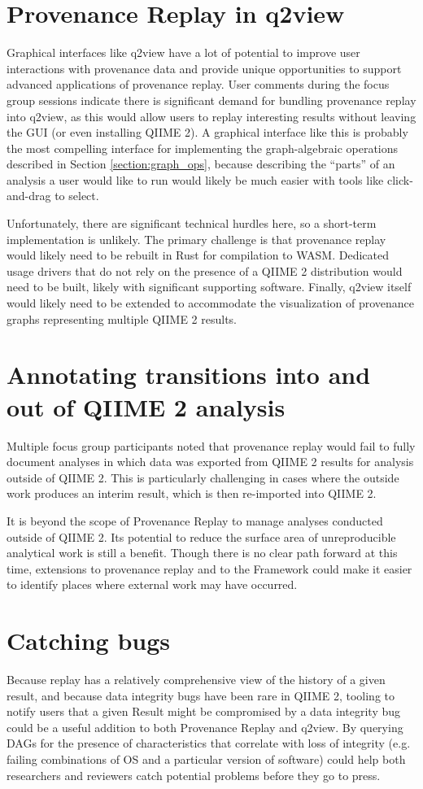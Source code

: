 \section{Provenance Replay in q2view \parencite[Issue 123]{qiime_2_development_team_issues_2016}}
Graphical interfaces like q2view have a lot of potential to improve user
interactions with provenance data and provide unique opportunities to support
advanced applications of provenance replay. User comments during the focus group
sessions indicate there is significant demand for bundling provenance replay
into q2view, as this would allow users to replay interesting results without
leaving the GUI (or even installing QIIME 2). A graphical interface like this is
probably the most compelling interface for implementing the graph-algebraic
operations described in Section \ref{section:graph_ops}, because describing
the “parts” of an analysis a user would like to run would likely be much easier
with tools like click-and-drag to select.

Unfortunately, there are significant technical hurdles here, so a short-term
implementation is unlikely. The primary challenge is that provenance replay
would likely need to be rebuilt in Rust for compilation to WASM. Dedicated usage
drivers that do not rely on the presence of a QIIME 2 distribution would need to
be built, likely with significant supporting software. Finally, q2view itself
would likely need to be extended to accommodate the visualization of provenance
graphs representing multiple QIIME 2 results.

\section{Annotating transitions into and out of QIIME 2 analysis \parencite[Issue 80]{keefe_issues_2021}}
Multiple focus group participants noted that provenance replay would fail to
fully document analyses in which data was exported from QIIME 2 results for
analysis outside of QIIME 2. This is particularly challenging in cases where the
outside work produces an interim result, which is then re-imported into QIIME 2.

It is beyond the scope of Provenance Replay to manage analyses conducted outside
of QIIME 2. Its potential to reduce the surface area of unreproducible
analytical work is still a benefit. Though there is no clear path forward at
this time, extensions to provenance replay and to the Framework could make it
easier to identify places where external work may have occurred.

\section{Catching bugs}
Because replay has a relatively comprehensive view of the history of a given
result, and because data integrity bugs have been rare in QIIME 2, tooling to
notify users that a given Result might be compromised by a data integrity bug
could be a useful addition to both Provenance Replay and q2view. By querying
DAGs for the presence of characteristics that correlate with loss of integrity
(e.g. failing combinations of OS and a particular version of software) could
help both researchers and reviewers catch potential problems before they go to
press.

